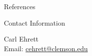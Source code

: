 \documentclass[final]{beamer}
\newlength{\onecolwid}
\begin{document}
\begin{frame}[t]
\begin{columns}[t]
\begin{column}{\onecolwid}
\begin{alertblock}{References}
{
\tiny




}

\end{alertblock}



\begin{alertblock}{Contact Information}

\centering Carl Ehrett\\
\centering Email: \href{mailto:cehrett@clemson.edu}{cehrett@clemson.edu}

\end{alertblock}



\end{column} %

\end{columns} %

\end{frame} %
\end{document}
